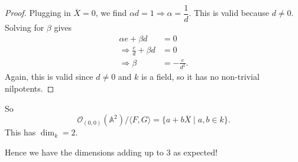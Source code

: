 \documentclass[12pt]{article}
\newcommand{\vbrack}[1]{\langle #1\rangle}
\theoremstyle{definition}
\begin{document}
\begin{itemize}
\begin{proof}
        Plugging in $\overline{X}=0$, we find $\alpha d=1\Rightarrow\alpha=\dfrac{1}{d}$. This is valid because $d\neq0$. Solving for $\beta$ gives
        \begin{align*}
            \alpha e+\beta d&=0\\
            \Rightarrow\frac{e}{d}+\beta d&=0\\
            \Rightarrow \beta&=-\frac{e}{d^2}.
        \end{align*}
        Again, this is valid since $d\neq0$ and $k$ is a field, so it has no non-trivial nilpotents.
    \end{proof}
    So 
    \[\mathcal{O}_{(0,0)}(\mathbb{A}^2)/\vbrack{F,G}=\{a+b\overline{X}\mid a,b\in k\}.\]
    This has $\dim_k=2$.
\end{itemize}
Hence we have the dimensions adding up to 3 as expected!
\end{document}
